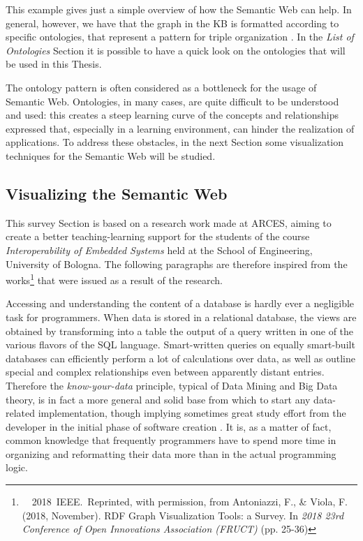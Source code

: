 This example gives just a simple overview of how the Semantic Web can help. In general, however, we have that the graph in the KB is formatted according to specific ontologies, that represent a pattern for triple organization \cite{noy2004semantic}. In the \textit{List of Ontologies} Section it is possible to have a quick look on the ontologies that will be used in this Thesis. 

The ontology pattern is often considered as a bottleneck for the usage of Semantic Web. Ontologies, in many cases, are quite difficult to be understood and used: this creates a steep learning curve of the concepts and relationships expressed that, especially in a learning environment, can hinder the realization of applications. To address these obstacles, in the next Section some visualization techniques for the Semantic Web will be studied.

\subsection{Visualizing the Semantic Web}
\label{ssec:visualization}

This survey Section is based on a research work made at ARCES, aiming to create a better teaching-learning support for the students of the course \textit{Interoperability of Embedded Systems} held at the School of Engineering, University of Bologna. The following paragraphs are therefore inspired from the works\footnote{~\faCopyright~2018~IEEE.~Reprinted, with permission, from Antoniazzi, F., \& Viola, F. (2018, November). RDF Graph Visualization Tools: a Survey. In \textit{2018 23rd Conference of Open Innovations Association (FRUCT)} (pp. 25-36)} that were issued as a result of the research.

Accessing and understanding the content of a database is hardly ever a negligible task for programmers. When data is stored in a relational database, the views are obtained by transforming into a table the output of a query written in one of the various flavors of the SQL language. Smart-written queries on equally smart-built databases can efficiently perform a lot of calculations over data, as well as outline special and complex relationships even between apparently distant entries. Therefore the \textit{know-your-data} principle, typical of Data Mining and Big Data theory, is in fact a more general and solid base from which to start any data-related implementation, though implying sometimes great study effort from the developer in the initial phase of software creation \cite{han2011data}. It is, as a matter of fact, common knowledge that frequently programmers have to spend more time in organizing and reformatting their data more than in the actual programming logic.

